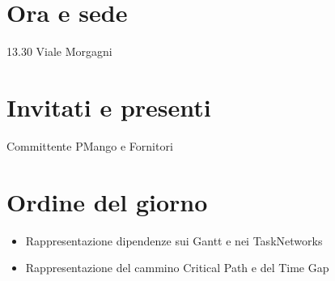 \section*{Ora e sede}
13.30 Viale Morgagni

\section*{Invitati e presenti}
Committente PMango e Fornitori

\section*{Ordine del giorno}
\begin{itemize}
  \item Rappresentazione dipendenze sui Gantt e nei TaskNetworks
  \item Rappresentazione del cammino Critical Path e del Time Gap 
\end{itemize}

